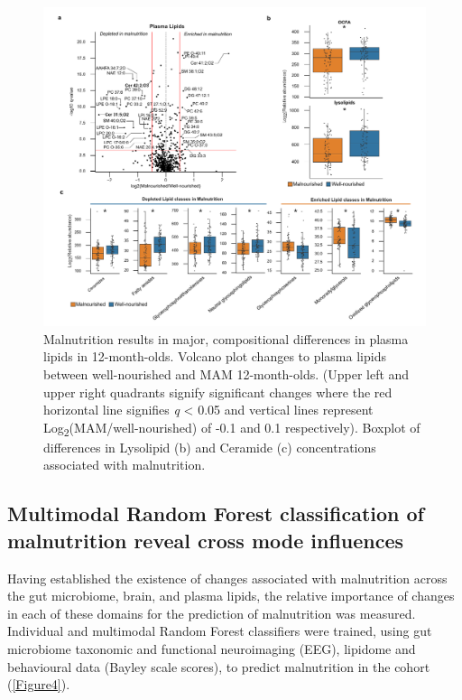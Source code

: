 \documentclass{article}
\begin{document}
\begin{figure}[!htb]
\centering
\includegraphics[scale=0.9]{../../figures/Figure3-lipids.pdf}
\caption[Malnutrition results in major compositional differences in plasma lipids in 12-month-olds]{
	Malnutrition results in major, compositional differences in plasma lipids in 12-month-olds.
	Volcano plot changes to plasma lipids between well-nourished and \gls{MAM} 12-month-olds.
	(Upper left and upper right quadrants signify significant changes where the red horizontal line signifies \textit{q} \textless{} 0.05 and vertical lines represent Log\textsubscript{2}(\gls{MAM}/well-nourished) of -0.1 and 0.1 respectively).
	Boxplot of differences in Lysolipid (b) and Ceramide (c) concentrations associated with malnutrition.}
\label{Figure3}
\end{figure}

\subsection*{Multimodal Random Forest classification of malnutrition reveal cross mode influences}
Having established the existence of changes associated with malnutrition across the gut microbiome, brain, and plasma lipids, the relative importance of changes in each of these domains for the prediction of malnutrition was measured.
Individual and multimodal Random Forest classifiers were trained, using gut microbiome taxonomic and functional neuroimaging (EEG), lipidome and behavioural data (Bayley scale scores), to predict malnutrition in the cohort (\autoref{Figure4}).
\end{document}
